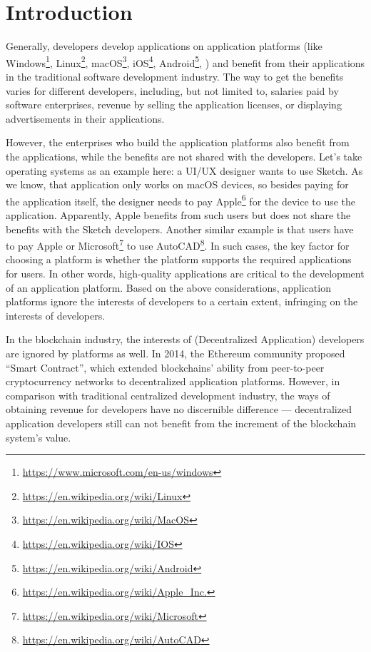 \section{Introduction}
\noindent
Generally, developers develop applications on application platforms (like
Windows\footnote{\url{https://www.microsoft.com/en-us/windows}}, Linux\footnote{\url{https://en.wikipedia.org/wiki/Linux}},
macOS\footnote{\url{https://en.wikipedia.org/wiki/MacOS}},
iOS\footnote{\url{https://en.wikipedia.org/wiki/IOS}},
Android\footnote{\url{https://en.wikipedia.org/wiki/Android}}, \etc) and
benefit from their applications in the traditional software development industry.
The way to get the benefits varies for different developers, including, but not
limited to, salaries paid by software enterprises, revenue by selling the
application licenses, or displaying advertisements in their applications.

However, the enterprises who build the application platforms also benefit
from the applications, while the benefits are not shared with the developers.
Let's take operating systems as an example here: a UI/UX designer wants to use Sketch.
As we know, that application only works on {macOS} devices, so besides
paying for the application itself, the designer needs to pay Apple\footnote{\url{https://en.wikipedia.org/wiki/Apple_Inc.}}
for the device  to use the application. Apparently, Apple benefits from such users but
does not share the benefits with the Sketch developers.
Another similar example is that users have to pay Apple or
Microsoft\footnote{\url{https://en.wikipedia.org/wiki/Microsoft}} to use
AutoCAD\footnote{\url{https://en.wikipedia.org/wiki/AutoCAD}}. In such cases,
the key factor for choosing a platform is whether the platform
supports the required applications for users. In other words, high-quality
applications are critical to the development of an application platform. Based on the above considerations,  application platforms ignore the interests of developers to a certain extent, infringing on the interests of developers.

In the blockchain industry, the interests of \dapp(Decentralized Application) developers are ignored by platforms  as  well.
 In 2014, the Ethereum community proposed ``Smart Contract'',
which extended blockchains' ability from peer-to-peer
cryptocurrency networks to decentralized application platforms. However, in comparison with traditional centralized development industry, the ways of obtaining revenue for developers have no discernible difference --- decentralized application developers still can not benefit
 from the increment of the blockchain system's value.


